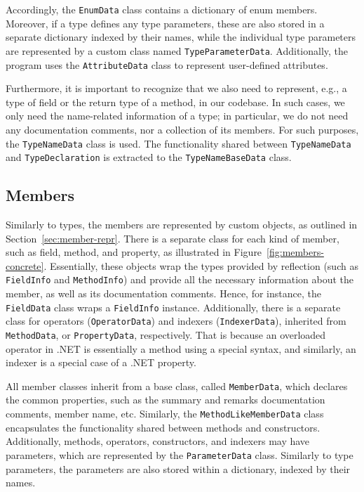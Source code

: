 Accordingly, the \texttt{EnumData} class contains a dictionary of enum members.
Moreover, if a type defines any type parameters, these are also stored in a separate dictionary indexed by their names, while the individual type parameters are represented by a custom class named \texttt{TypeParameterData}.
Additionally, the program uses the \texttt{AttributeData} class to represent user-defined attributes.

Furthermore, it is important to recognize that we also need to represent, e.g., a type of field or the return type of a method, in our codebase.
In such cases, we only need the name-related information of a type; in particular, we do not need any documentation comments, nor a collection of its members.
For such purposes, the \texttt{TypeNameData} class is used.
The functionality shared between \texttt{TypeNameData} and \texttt{TypeDeclaration} is extracted to the \texttt{TypeNameBaseData} class.

\subsection{Members}

Similarly to types, the members are represented by custom objects, as outlined in Section~\ref{sec:member-repr}.
There is a separate class for each kind of member, such as field, method, and property, as illustrated in Figure~\ref{fig:members-concrete}.
Essentially, these objects wrap the types provided by reflection (such as \texttt{FieldInfo} and \texttt{MethodInfo}) and provide all the necessary information about the member, as well as its documentation comments.
Hence, for instance, the \texttt{FieldData} class wraps a \texttt{FieldInfo} instance.
Additionally, there is a separate class for operators (\texttt{OperatorData}) and indexers (\texttt{IndexerData}), inherited from \texttt{MethodData}, or \texttt{PropertyData}, respectively.
That is because an overloaded operator in .NET is essentially a method using a special syntax, and similarly, an indexer is a special case of a .NET property.

All member classes inherit from a base class, called \texttt{MemberData}, which declares the common properties, such as the summary and remarks documentation comments, member name, etc.
Similarly, the \texttt{MethodLikeMemberData} class encapsulates the functionality shared between methods and constructors.
Additionally, methods, operators, constructors, and indexers may have parameters, which are represented by the \texttt{ParameterData} class.
Similarly to type parameters, the parameters are also stored within a dictionary, indexed by their names.

